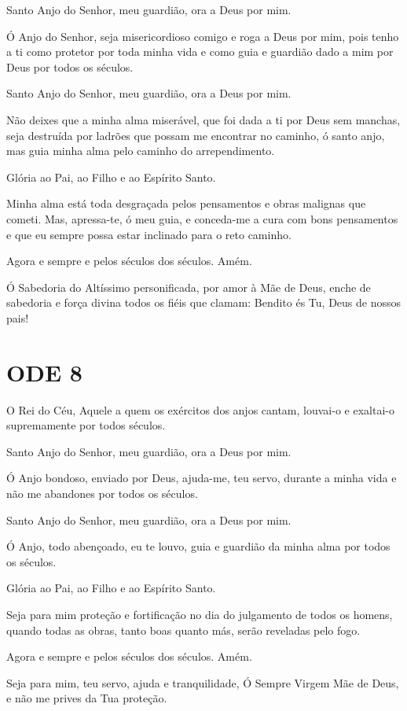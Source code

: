 \documentclass{subfiles}
\begin{document}
Santo Anjo do Senhor, meu guardião, ora a Deus por mim.

Ó Anjo do Senhor, seja misericordioso comigo e roga a Deus por mim,
pois tenho a ti como protetor por toda minha vida e como guia e guardião dado
a mim por Deus por todos os séculos.

Santo Anjo do Senhor, meu guardião, ora a Deus por mim.

Não deixes que a minha alma miserável, que foi dada a ti por Deus sem
manchas, seja destruída por ladrões que possam me encontrar no caminho, ó
santo anjo, mas guia minha alma pelo caminho do arrependimento.

Glória ao Pai, ao Filho e ao Espírito Santo.

Minha alma está toda desgraçada pelos pensamentos e obras malignas
que cometi. Mas, apressa-te, ó meu guia, e conceda-me a cura com bons
pensamentos e que eu sempre possa estar inclinado para o reto caminho.

Agora e sempre e pelos séculos dos séculos. Amém.

Ó Sabedoria do Altíssimo personificada, por amor à Mãe de Deus,
enche de sabedoria e força divina todos os fiéis que clamam: Bendito és Tu,
Deus de nossos pais!

\section{ODE 8}

\eirmos{}O Rei do Céu, Aquele a quem os exércitos dos anjos cantam, louvai-o e
exaltai-o supremamente por todos séculos.

Santo Anjo do Senhor, meu guardião, ora a Deus por mim.

Ó Anjo bondoso, enviado por Deus, ajuda-me, teu servo, durante a
minha vida e não me abandones por todos os séculos.

Santo Anjo do Senhor, meu guardião, ora a Deus por mim.

Ó Anjo, todo abençoado, eu te louvo, guia e guardião da minha alma
por todos os séculos.

Glória ao Pai, ao Filho e ao Espírito Santo.

Seja para mim proteção e fortificação no dia do julgamento de todos
os homens, quando todas as obras, tanto boas quanto más, serão reveladas
pelo fogo.

Agora e sempre e pelos séculos dos séculos. Amém.

Seja para mim, teu servo, ajuda e tranquilidade, Ó Sempre Virgem Mãe
de Deus, e não me prives da Tua proteção.
\end{document}
